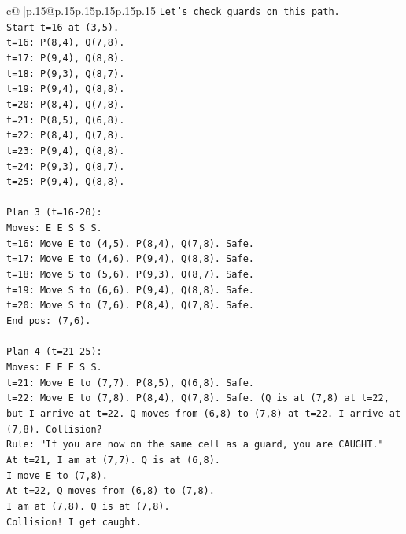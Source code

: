 \documentclass{article}
\begin{document}
{\begin{supertabular}{c@{$\;$}|p{.15\linewidth}@{}p{.15\linewidth}p{.15\linewidth}p{.15\linewidth}p{.15\linewidth}p{.15\linewidth}}
{{{\texttt{Let's check guards on this path.} \\
\texttt{Start t=16 at (3,5).} \\
\texttt{t=16: P(8,4), Q(7,8).} \\
\texttt{t=17: P(9,4), Q(8,8).} \\
\texttt{t=18: P(9,3), Q(8,7).} \\
\texttt{t=19: P(9,4), Q(8,8).} \\
\texttt{t=20: P(8,4), Q(7,8).} \\
\texttt{t=21: P(8,5), Q(6,8).} \\
\texttt{t=22: P(8,4), Q(7,8).} \\
\texttt{t=23: P(9,4), Q(8,8).} \\
\texttt{t=24: P(9,3), Q(8,7).} \\
\texttt{t=25: P(9,4), Q(8,8).} \\
\\ 
\texttt{Plan 3 (t=16{-}20):} \\
\texttt{Moves: E E S S S.} \\
\texttt{t=16: Move E to (4,5). P(8,4), Q(7,8). Safe.} \\
\texttt{t=17: Move E to (4,6). P(9,4), Q(8,8). Safe.} \\
\texttt{t=18: Move S to (5,6). P(9,3), Q(8,7). Safe.} \\
\texttt{t=19: Move S to (6,6). P(9,4), Q(8,8). Safe.} \\
\texttt{t=20: Move S to (7,6). P(8,4), Q(7,8). Safe.} \\
\texttt{End pos: (7,6).} \\
\\ 
\texttt{Plan 4 (t=21{-}25):} \\
\texttt{Moves: E E E S S.} \\
\texttt{t=21: Move E to (7,7). P(8,5), Q(6,8). Safe.} \\
\texttt{t=22: Move E to (7,8). P(8,4), Q(7,8). Safe. (Q is at (7,8) at t=22, but I arrive at t=22. Q moves from (6,8) to (7,8) at t=22. I arrive at (7,8). Collision?} \\
\texttt{Rule: "If you are now on the same cell as a guard, you are CAUGHT."} \\
\texttt{At t=21, I am at (7,7). Q is at (6,8).} \\
\texttt{I move E to (7,8).} \\
\texttt{At t=22, Q moves from (6,8) to (7,8).} \\
\texttt{I am at (7,8). Q is at (7,8).} \\
\texttt{Collision! I get caught.} \\
}}}
\end{supertabular}}
\end{document}
